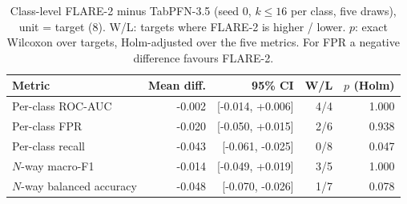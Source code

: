 \documentclass[pdflatex,sn-mathphys-num]{sn-jnl}%
\begin{document}
\begin{table}[htbp]
\centering\small
\caption{Class-level FLARE-2 minus TabPFN-3.5 (seed 0, $k\le16$ per class, five draws), unit = target (8). W/L: targets where FLARE-2 is higher / lower. $p$: exact Wilcoxon over targets, Holm-adjusted over the five metrics. For FPR a negative difference favours FLARE-2.}\label{tab:tabpfnclass}
{\scriptsize\setlength{\tabcolsep}{2.5pt}\begin{tabular}{lrrrr}
\toprule
Metric & Mean diff. & 95\% CI & W/L & $p$ (Holm) \\
\midrule
Per-class ROC-AUC & -0.002 & [-0.014, +0.006] & 4/4 & 1.000 \\
Per-class FPR & -0.020 & [-0.050, +0.015] & 2/6 & 0.938 \\
Per-class recall & -0.043 & [-0.061, -0.025] & 0/8 & 0.047 \\
$N$-way macro-F1 & -0.014 & [-0.049, +0.019] & 3/5 & 1.000 \\
$N$-way balanced accuracy & -0.048 & [-0.070, -0.026] & 1/7 & 0.078 \\
\bottomrule
\end{tabular}}
\end{table}
\end{document}
